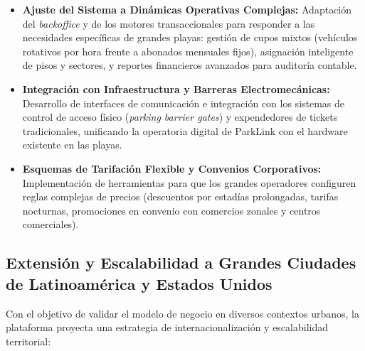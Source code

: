 \begin{itemize}
    \item \textbf{Ajuste del Sistema a Dinámicas Operativas Complejas:} Adaptación del \textit{backoffice} y de los motores transaccionales para responder a las necesidades específicas de grandes playas: gestión de cupos mixtos (vehículos rotativos por hora frente a abonados mensuales fijos), asignación inteligente de pisos y sectores, y reportes financieros avanzados para auditoría contable.
    \item \textbf{Integración con Infraestructura y Barreras Electromecánicas:} Desarrollo de interfaces de comunicación e integración con los sistemas de control de acceso físico (\textit{parking barrier gates}) y expendedores de tickets tradicionales, unificando la operatoria digital de ParkLink con el hardware existente en las playas.
    \item \textbf{Esquemas de Tarifación Flexible y Convenios Corporativos:} Implementación de herramientas para que los grandes operadores configuren reglas complejas de precios (descuentos por estadías prolongadas, tarifas nocturnas, promociones en convenio con comercios zonales y centros comerciales).
\end{itemize}

\subsection{Extensión y Escalabilidad a Grandes Ciudades de Latinoamérica y Estados Unidos}

Con el objetivo de validar el modelo de negocio en diversos contextos urbanos, la plataforma proyecta una estrategia de internacionalización y escalabilidad territorial:

